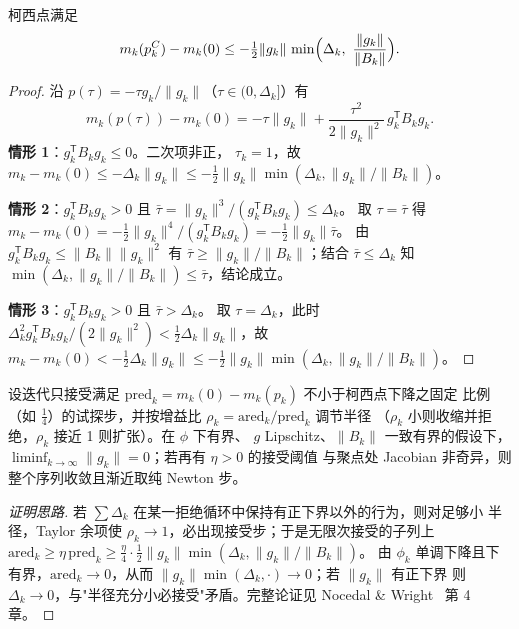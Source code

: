 \begin{lemma}[柯西点的充分下降]\label{sec:pf-th-glob-lem-cauchy}
柯西点满足
\begin{equation}
m_k(p_k^{C})-m_k(0)\le-\tfrac12\lVert g_k\rVert\,
\min\Bigl(\Delta_k,\ \frac{\lVert g_k\rVert}{\lVert B_k\rVert}\Bigr).
\end{equation}
\end{lemma}

\begin{proof}
沿 $p(\tau)=-\tau g_k/\lVert g_k\rVert$（$\tau\in(0,\Delta_k]$）有
\[
m_k(p(\tau))-m_k(0)=-\tau\lVert g_k\rVert
+\frac{\tau^2}{2\lVert g_k\rVert^2}\,g_k^{\mathsf T}B_k g_k .
\]
\textbf{情形 1}：$g_k^{\mathsf T}B_k g_k\le0$。二次项非正，
$\tau_k=1$，故
$m_k-m_k(0)\le-\Delta_k\lVert g_k\rVert\le-\tfrac12\lVert g_k\rVert
\min(\Delta_k,\lVert g_k\rVert/\lVert B_k\rVert)$。

\textbf{情形 2}：$g_k^{\mathsf T}B_k g_k>0$ 且
$\bar\tau=\lVert g_k\rVert^3/(g_k^{\mathsf T}B_k g_k)\le\Delta_k$。
取 $\tau=\bar\tau$ 得
$m_k-m_k(0)=-\tfrac12\lVert g_k\rVert^4/(g_k^{\mathsf T}B_k g_k)
=-\tfrac12\lVert g_k\rVert\bar\tau$。
由 $g_k^{\mathsf T}B_k g_k\le\lVert B_k\rVert\lVert g_k\rVert^2$ 有
$\bar\tau\ge\lVert g_k\rVert/\lVert B_k\rVert$；结合
$\bar\tau\le\Delta_k$ 知
$\min(\Delta_k,\lVert g_k\rVert/\lVert B_k\rVert)\le\bar\tau$，结论成立。

\textbf{情形 3}：$g_k^{\mathsf T}B_k g_k>0$ 且 $\bar\tau>\Delta_k$。
取 $\tau=\Delta_k$，此时 $\Delta_k^2 g_k^{\mathsf T}B_k g_k/
(2\lVert g_k\rVert^2)<\tfrac12\Delta_k\lVert g_k\rVert$，故
$m_k-m_k(0)<-\tfrac12\Delta_k\lVert g_k\rVert
\le-\tfrac12\lVert g_k\rVert\min(\Delta_k,\lVert g_k\rVert/\lVert B_k\rVert)$。
\end{proof}

\begin{theorem}[信赖域全局收敛（陈述）]\label{sec:pf-th-glob-thm-tr}
设迭代只接受满足 $\mathrm{pred}_k=m_k(0)-m_k(p_k)$ 不小于柯西点下降之固定
比例（如 $\tfrac14$）的试探步，并按增益比
$\rho_k=\mathrm{ared}_k/\mathrm{pred}_k$ 调节半径
（$\rho_k$ 小则收缩并拒绝，$\rho_k$ 接近 1 则扩张）。在 $\phi$ 下有界、
$g$ Lipschitz、$\lVert B_k\rVert$ 一致有界的假设下，
$\liminf_{k\to\infty}\lVert g_k\rVert=0$；若再有 $\eta>0$ 的接受阈值
与聚点处 Jacobian 非奇异，则整个序列收敛且渐近取纯 Newton 步。
\end{theorem}

\begin{proof}[证明思路]
若 $\sum\Delta_k$ 在某一拒绝循环中保持有正下界以外的行为，则对足够小
半径，Taylor 余项使 $\rho_k\to1$，必出现接受步；于是无限次接受的子列上
$\mathrm{ared}_k\ge\eta\,\mathrm{pred}_k
\ge\frac{\eta}{4}\cdot\tfrac12\lVert g_k\rVert
\min(\Delta_k,\lVert g_k\rVert/\lVert B_k\rVert)$。
由 $\phi_k$ 单调下降且下有界，$\mathrm{ared}_k\to0$，从而
$\lVert g_k\rVert\min(\Delta_k,\cdot)\to0$；若 $\lVert g_k\rVert$ 有正下界
则 $\Delta_k\to0$，与"半径充分小必接受"矛盾。完整论证见
Nocedal \& Wright~\cite{pfglob-nw} 第 4 章。
\end{proof}

